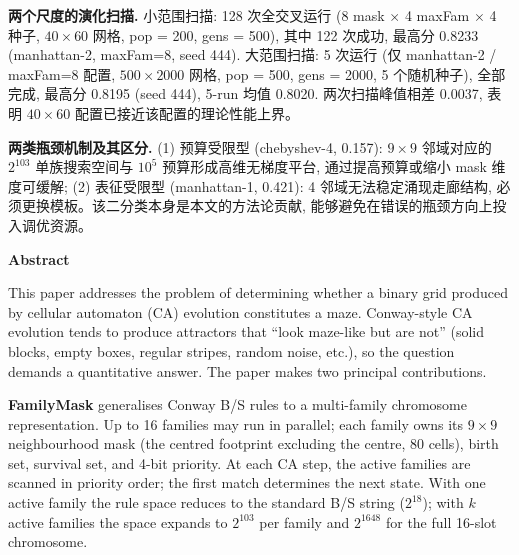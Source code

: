 \noindent\textbf{两个尺度的演化扫描.} 小范围扫描: 128 次全交叉运行 (8 mask $\times$ 4 maxFam $\times$ 4 种子, $40 \times 60$ 网格, pop = 200, gens = 500), 其中 122 次成功, 最高分 0.8233 (manhattan-2, maxFam=8, seed 444). 大范围扫描: 5 次运行 (仅 manhattan-2 / maxFam=8 配置, $500 \times 2000$ 网格, pop = 500, gens = 2000, 5 个随机种子), 全部完成, 最高分 0.8195 (seed 444), 5-run 均值 0.8020. 两次扫描峰值相差 0.0037, 表明 $40 \times 60$ 配置已接近该配置的理论性能上界。

\noindent\textbf{两类瓶颈机制及其区分.} (1) 预算受限型 (chebyshev-4, 0.157): $9 \times 9$ 邻域对应的 $2^{103}$ 单族搜索空间与 $10^5$ 预算形成高维无梯度平台, 通过提高预算或缩小 mask 维度可缓解; (2) 表征受限型 (manhattan-1, 0.421): 4 邻域无法稳定涌现走廊结构, 必须更换模板。该二分类本身是本文的方法论贡献, 能够避免在错误的瓶颈方向上投入调优资源。

\vspace{0.5em}
\begin{center}
{\large\bfseries\textcolor{Vermilion}{Abstract}}
\end{center}

\noindent
This paper addresses the problem of determining whether a binary grid produced by cellular automaton (CA) evolution constitutes a maze. Conway-style CA evolution tends to produce attractors that ``look maze-like but are not'' (solid blocks, empty boxes, regular stripes, random noise, etc.), so the question demands a quantitative answer. The paper makes two principal contributions.

\noindent\textbf{FamilyMask} generalises Conway B/S rules to a multi-family chromosome representation. Up to 16 families may run in parallel; each family owns its $9 \times 9$ neighbourhood mask (the centred footprint excluding the centre, 80 cells), birth set, survival set, and 4-bit priority. At each CA step, the active families are scanned in priority order; the first match determines the next state. With one active family the rule space reduces to the standard B/S string ($2^{18}$); with $k$ active families the space expands to $2^{103}$ per family and $2^{1648}$ for the full 16-slot chromosome.

